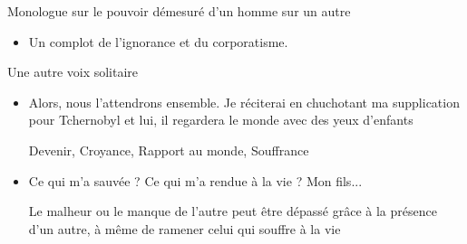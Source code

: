 \documentclass[french,a4paper,11pt,answers]{exam}
\newcommand{\cit}[2]{\og #1 \fg{} \begin{solution}{ #2 }\end{solution}} %
\begin{document}
	\begin{cadre}{Monologue sur le pouvoir démesuré d'un homme sur un autre}
		\begin{itemize}
			\item \cit{Un complot de l'ignorance et du corporatisme.}
				{}
		\end{itemize}
	\end{cadre}
	
	\begin{cadre}{Une autre voix solitaire}
		\begin{itemize}
			\item \cit{Alors, nous l'attendrons ensemble. Je réciterai en chuchotant ma supplication pour Tchernobyl et lui, il regardera le monde avec des yeux d'enfants}
				{Devenir, Croyance, Rapport au monde, Souffrance}
			\item \cit{Ce qui m'a sauvée ? Ce qui m'a rendue à la vie ? Mon fils...}
				{Le malheur ou le manque de l'autre peut être dépassé grâce à la présence d'un autre, à même de ramener celui qui souffre à la vie}
		\end{itemize}
	\end{cadre}
\end{document}
